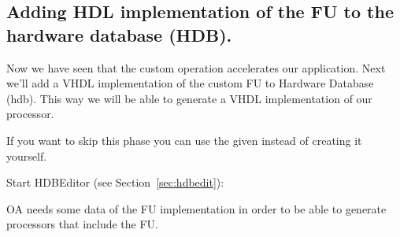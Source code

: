 \documentclass[a4paper,twoside]{tceusermanual}
\begin{document}
\subsection{Adding HDL implementation of the FU to the hardware database
(HDB).}
\label{par:AddToHDB}

Now we have seen that the custom operation accelerates our application. Next
we'll add a VHDL implementation of the custom FU to Hardware Database (hdb).
This way we will be able to generate a VHDL implementation of our processor.

If you want to skip this phase you can use the given 
instead of creating it yourself.

Start HDBEditor (see Section~\ref{sec:hdbedit}): \\

OA needs some data of the FU implementation in order to be able to
generate processors that include the FU. \\
\end{document}
